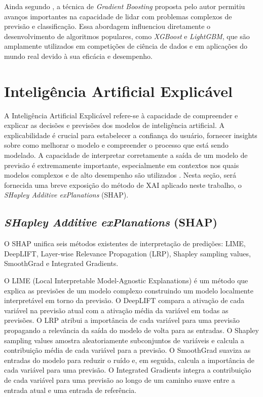 Ainda segundo , a técnica de \textit{Gradient Boosting} proposta pelo autor permitiu avanços importantes na capacidade de lidar com problemas complexos de previsão e classificação. Essa abordagem influenciou diretamente o desenvolvimento de algoritmos populares, como \textit{XGBoost} e \textit{LightGBM}, que são amplamente utilizados em competições de ciência de dados e em aplicações do mundo real devido à sua eficácia e desempenho.

\section{Inteligência Artificial Explicável}

A Inteligência Artificial Explicável refere-se à capacidade de compreender e explicar as decisões e previsões dos modelos de inteligência artificial. A explicabilidade é crucial para estabelecer a confiança do usuário, fornecer insights sobre como melhorar o modelo e compreender o processo que está sendo modelado. A capacidade de interpretar corretamente a saída de um modelo de previsão é extremamente importante, especialmente em contextos nos quais modelos complexos e de alto desempenho são utilizados \cite{Shap2017}. Nesta seção, será fornecida uma breve exposição do método de XAI aplicado neste trabalho, o \textit{SHapley Additive exPlanations} (SHAP).

\subsection{\textit{SHapley Additive exPlanations} (SHAP)}\label{sec:shap}

O SHAP \cite{Shap2017} unifica seis métodos existentes de interpretação de predições: LIME, DeepLIFT, Layer-wise Relevance Propagation (LRP), Shapley sampling values, SmoothGrad e Integrated Gradients.

O LIME (Local Interpretable Model-Agnostic Explanations) \cite{Lime2016} é um método que explica as previsões de um modelo complexo construindo um modelo localmente interpretável em torno da previsão. O DeepLIFT \cite{Deeplift} compara a ativação de cada variável na previsão atual com a ativação média da variável em todas as previsões. O LRP \cite{LRP2015} atribui a importância de cada variável para uma previsão propagando a relevância da saída do modelo de volta para as entradas. O Shapley sampling values \cite{Strumbelj2014} amostra aleatoriamente subconjuntos de variáveis e calcula a contribuição média de cada variável para a previsão. O SmoothGrad \cite{SmoothGrad} suaviza as entradas do modelo para reduzir o ruído e, em seguida, calcula a importância de cada variável para uma previsão. O Integrated Gradients \cite{IntegratedGradients} integra a contribuição de cada variável para uma previsão ao longo de um caminho suave entre a entrada atual e uma entrada de referência.

